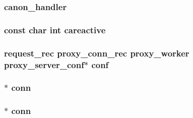 \subsubsection[{\texorpdfstring{canon\+\_\+handler}{canon_handler}}]{\setlength{\rightskip}{0pt plus 5cm}canon\+\_\+handler}\hypertarget{group__MOD__PROXY_gae1b959459c672856e6ddbe5c4516c7f0}{}\label{group__MOD__PROXY_gae1b959459c672856e6ddbe5c4516c7f0}
\subsubsection[{\texorpdfstring{careactive}{careactive}}]{ const char {\bf int} careactive}\hypertarget{group__MOD__PROXY_ga907a0511ba7126274d551c5c89f7cd25}{}\label{group__MOD__PROXY_ga907a0511ba7126274d551c5c89f7cd25}
\subsubsection[{\texorpdfstring{conf}{conf}}]{ {\bf request\+\_\+rec} {\bf proxy\+\_\+conn\+\_\+rec} {\bf proxy\+\_\+worker} {\bf proxy\+\_\+server\+\_\+conf}$\ast$ conf}\hypertarget{group__MOD__PROXY_ga4d7edd451c4bb8ed9ce9012e5dea2b14}{}\label{group__MOD__PROXY_ga4d7edd451c4bb8ed9ce9012e5dea2b14}
\subsubsection[{\texorpdfstring{conn}{conn}}]{ $\ast$ conn}\hypertarget{group__MOD__PROXY_gaaf2a99e7e3709d3e41bf0a33f1004b4e}{}\label{group__MOD__PROXY_gaaf2a99e7e3709d3e41bf0a33f1004b4e}
\subsubsection[{\texorpdfstring{conn}{conn}}]{$\ast$ conn}\hypertarget{group__MOD__PROXY_gaf26a520a5f2c0d567cd7732f04c925c2}{}\label{group__MOD__PROXY_gaf26a520a5f2c0d567cd7732f04c925c2}
